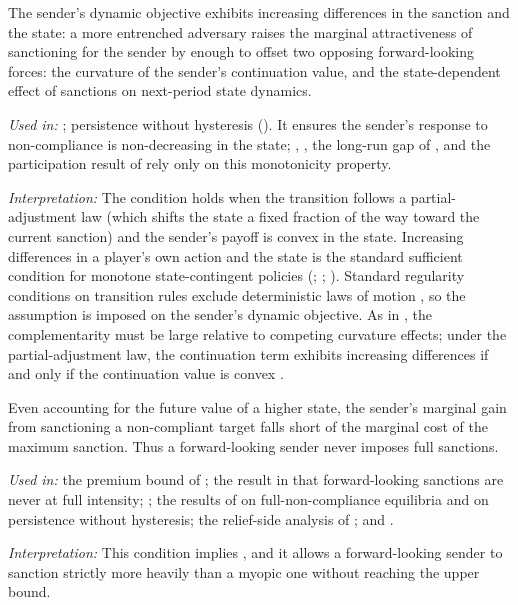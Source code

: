 \begin{assumption}
\label{ass:dynamic-complementarity}
The sender's dynamic objective exhibits increasing differences in the sanction and
the state: a more entrenched adversary raises the marginal attractiveness of
sanctioning for the sender by enough to offset two opposing forward-looking forces:
the curvature of the sender's continuation value, and the state-dependent effect of sanctions on next-period state dynamics.
\end{assumption}
\noindent\textit{Used in:} ; persistence without
hysteresis (). It ensures the sender's response to
non-compliance is non-decreasing in the state; ,
, the long-run gap of ,
and the participation result of  rely only on this
monotonicity property.\par
\noindent\textit{Interpretation:} The condition holds when the transition follows a partial-adjustment law (which shifts the state a fixed fraction of the way toward the
current sanction) and the sender's payoff is convex in the state. Increasing
differences in a player's own action and the state is the standard sufficient
condition for monotone state-contingent policies
(\citealp[Thm.~3.9.2]{topkis1998}; \citealp{Curtat1996};
\citealp[p.~826]{BalbusReffettWozny2014JET}). Standard regularity conditions on transition rules exclude deterministic laws of motion \citep[p.~44]{Amir2002}, so the
assumption is imposed on the sender's dynamic objective. As in
\citet[p.~1403]{HopenhaynPrescott1992}, the complementarity must be large relative to
competing curvature effects; under the partial-adjustment law, the continuation term
exhibits increasing differences if and only if the continuation value is convex
\citep[Lemma~2.6.2]{topkis1998}.

\begin{assumption}[Interiority]
\label{ass:interiority}
Even accounting for the future value of a higher state, the sender's marginal gain
from sanctioning a non-compliant target falls short of the marginal cost of the
maximum sanction. Thus a forward-looking sender never imposes full sanctions.
\end{assumption}
\noindent\textit{Used in:} the premium bound of ; the result in
 that forward-looking sanctions are never at full
intensity; ; the results of 
on full-non-compliance equilibria and on persistence without hysteresis; the
relief-side analysis of ; and .\par
\noindent\textit{Interpretation:} This condition implies ,
and it allows a forward-looking sender to sanction strictly more heavily than a
myopic one without reaching the upper bound.

